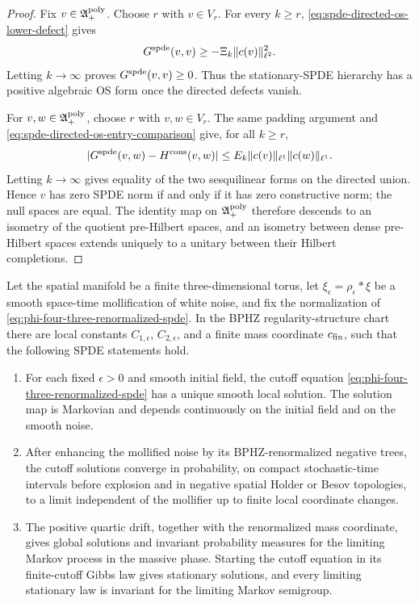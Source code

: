 \begin{proof}
Fix \(v\in\mathfrak A_+^{\rm poly}\).  Choose \(r\) with \(v\in V_r\).  For
every \(k\geq r\), \eqref{eq:spde-directed-os-lower-defect} gives
\[
  G^{\rm spde}(v,v)\geq-\Xi_k\|c(v)\|_{\ell^2}^2.
\]
Letting \(k\to\infty\) proves \(G^{\rm spde}(v,v)\geq0\).  Thus the
stationary-SPDE hierarchy has a positive algebraic OS form once the directed
defects vanish.

For \(v,w\in\mathfrak A_+^{\rm poly}\), choose \(r\) with \(v,w\in V_r\).  The
same padding argument and
\eqref{eq:spde-directed-os-entry-comparison} give, for all \(k\geq r\),
\[
  |G^{\rm spde}(v,w)-H^{\rm cons}(v,w)|
  \leq E_k\|c(v)\|_{\ell^1}\|c(w)\|_{\ell^1}.
\]
Letting \(k\to\infty\) gives equality of the two sesquilinear forms on the
directed union.  Hence \(v\) has zero SPDE norm if and only if it has zero
constructive norm; the null spaces are equal.  The identity map on
\(\mathfrak A_+^{\rm poly}\) therefore descends to an isometry of the
quotient pre-Hilbert spaces, and an isometry between dense pre-Hilbert spaces
extends uniquely to a unitary between their Hilbert completions.
\end{proof}

\begin{quotedtheorem}
\label{thm:renormalized-phi-four-three-spde-datum}
Let the spatial manifold be a finite three-dimensional torus, let
\(\xi_\epsilon=\rho_\epsilon\ast\xi\) be a smooth space-time mollification
of white noise, and fix the normalization of
\eqref{eq:phi-four-three-renormalized-spde}.  In the BPHZ
regularity-structure chart there are local constants
\(C_{1,\epsilon}\), \(C_{2,\epsilon}\), and a finite mass coordinate
\(c_{\rm fin}\), such that the following SPDE statements hold.
\begin{enumerate}[label=(\roman*)]
  \item For each fixed \(\epsilon>0\) and smooth initial field, the cutoff
  equation \eqref{eq:phi-four-three-renormalized-spde} has a unique smooth
  local solution.  The solution map is Markovian and depends continuously on
  the initial field and on the smooth noise.
  \item After enhancing the mollified noise by its BPHZ-renormalized negative
  trees, the cutoff solutions converge in probability, on compact
  stochastic-time intervals before explosion and in negative spatial Holder
  or Besov topologies, to a limit independent of the mollifier up to finite
  local coordinate changes.
  \item The positive quartic drift, together with the renormalized mass
  coordinate, gives global solutions and invariant probability measures for
  the limiting Markov process in the massive phase.  Starting the cutoff
  equation in its finite-cutoff Gibbs law gives stationary solutions, and
  every limiting stationary law is invariant for the limiting Markov
  semigroup.
\end{enumerate}
\end{quotedtheorem}

